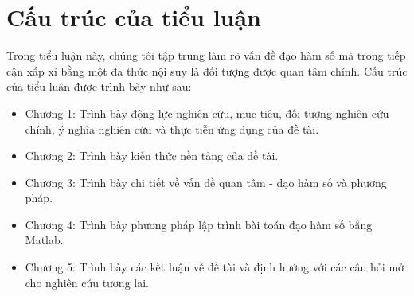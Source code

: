 \section{Cấu trúc của tiểu luận}

Trong tiểu luận này, chúng tôi tập trung làm rõ vấn đề đạo hàm số mà trong tiếp cận xấp xỉ bằng một đa thức nội suy là đối tượng được quan tâm chính. Cấu trúc của tiểu luận được trình bày như sau:
\begin{itemize}
    \item Chương 1: Trình bày động lực nghiên cứu, mục tiêu, đối tượng nghiên cứu chính, ý nghĩa nghiên cứu và thực tiễn ứng dụng của đề tài.
    \item Chương 2: Trình bày kiến thức nền tảng của đề tài.
    \item Chương 3: Trình bày chi tiết về vấn đề quan tâm - đạo hàm số và phương pháp.
    \item Chương 4: Trình bày phương pháp lập trình bài toán đạo hàm số bằng Matlab.
    \item Chương 5: Trình bày các kết luận về đề tài và định hướng với các câu hỏi mở cho nghiên cứu tương lai.
\end{itemize}